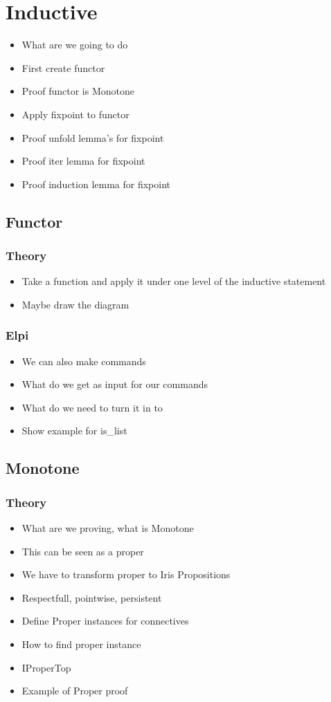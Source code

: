 \documentclass[thesis.tex]{subfiles}
\begin{document}
\chapter{Inductive}
\begin{itemize}
  \item What are we going to do
  \item First create functor
  \item Proof functor is Monotone
  \item Apply fixpoint to functor
  \item Proof unfold lemma's for fixpoint
  \item Proof iter lemma for fixpoint
  \item Proof induction lemma for fixpoint
\end{itemize}

\section{Functor}
\subsection{Theory}
\begin{itemize}
  \item Take a function and apply it under one level of the inductive statement
  \item Maybe draw the diagram
\end{itemize}

\subsection{Elpi}
\begin{itemize}
  \item We can also make commands
  \item What do we get as input for our commands
  \item What do we need to turn it in to
  \item Show example for is_list
\end{itemize}

\section{Monotone}
\subsection{Theory}
\begin{itemize}
  \item What are we proving, what is Monotone
  \item This can be seen as a proper
  \item We have to transform proper to Iris Propositions
  \item Respectfull, pointwise, persistent
  \item Define Proper instances for connectives
  \item How to find proper instance
  \item IProperTop
  \item Example of Proper proof
\end{itemize}
\end{document}
